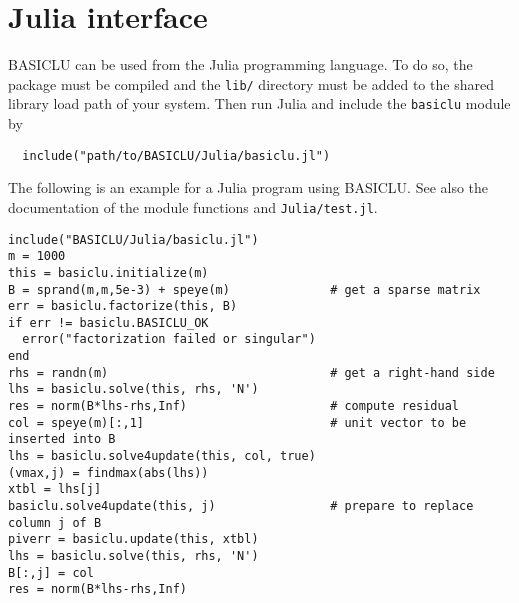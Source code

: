 \documentclass{article}
\newcommand{\ct}{\texttt}
\begin{document}
\section{Julia interface}
BASICLU can be used from the Julia programming language. To do so, the package
must be compiled and the \ct{lib/} directory must be added to the shared library
load path of your system. Then run Julia and include the \ct{basiclu} module by
\begin{verbatim}
  include("path/to/BASICLU/Julia/basiclu.jl")
\end{verbatim}
The following is an example for a Julia program using BASICLU. See also the
documentation of the module functions and \ct{Julia/test.jl}.
{\footnotesize
\begin{verbatim}
include("BASICLU/Julia/basiclu.jl")
m = 1000
this = basiclu.initialize(m)
B = sprand(m,m,5e-3) + speye(m)              # get a sparse matrix
err = basiclu.factorize(this, B)
if err != basiclu.BASICLU_OK
  error("factorization failed or singular")
end
rhs = randn(m)                               # get a right-hand side
lhs = basiclu.solve(this, rhs, 'N')
res = norm(B*lhs-rhs,Inf)                    # compute residual
col = speye(m)[:,1]                          # unit vector to be inserted into B
lhs = basiclu.solve4update(this, col, true)
(vmax,j) = findmax(abs(lhs))
xtbl = lhs[j]
basiclu.solve4update(this, j)                # prepare to replace column j of B
piverr = basiclu.update(this, xtbl)
lhs = basiclu.solve(this, rhs, 'N')
B[:,j] = col
res = norm(B*lhs-rhs,Inf)
\end{verbatim}
}
\end{document}
